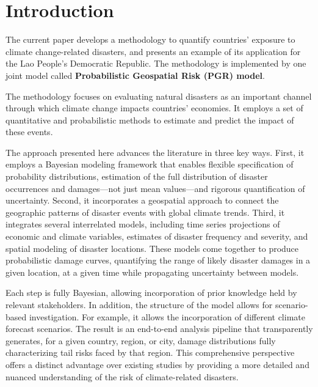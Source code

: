 
\section{Introduction}
\label{sec:introduction}

The current paper develops a methodology to quantify countries' exposure to climate change-related disasters, and presents an example of its application for the Lao People's Democratic Republic. The methodology is implemented by one joint model called \textbf{Probabilistic Geospatial Risk (PGR) model}.

The methodology focuses on evaluating natural disasters as an important channel through which climate change impacts countries' economies. It employs a set of quantitative and probabilistic methods to estimate and predict the impact of these events.

The approach presented here advances the literature in three key ways. First, it employs a Bayesian modeling framework that enables flexible specification of probability distributions, estimation of the full distribution of disaster occurrences and damages---not just mean values---and rigorous quantification of uncertainty. Second, it incorporates a geospatial approach to connect the geographic patterns of disaster events with global climate trends. Third, it integrates several interrelated models, including time series projections of economic and climate variables, estimates of disaster frequency and severity, and spatial modeling of disaster locations. These models come together to produce probabilistic damage curves, quantifying the range of likely disaster damages in a given location, at a given time while propagating uncertainty between models.

Each step is fully Bayesian, allowing incorporation of prior knowledge held by relevant stakeholders. In addition, the structure of the model allows for scenario-based investigation. For example, it allows the incorporation of different climate forecast scenarios. The result is an end-to-end analysis pipeline that transparently generates, for a given country, region, or city, damage distributions fully characterizing tail risks faced by that region. This comprehensive perspective offers a distinct advantage over existing studies by providing a more detailed and nuanced understanding of the risk of climate-related disasters.

\newpage
